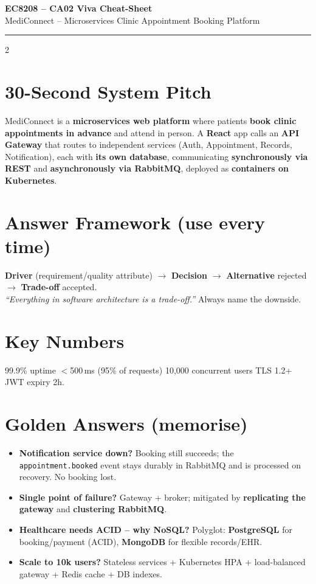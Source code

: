 \documentclass[10pt,a4paper]{article}
\newcommand{\hd}[1]{\textbf{\color{navy}#1}}
\begin{document}
{\centering
{\large\bfseries\color{navy} EC8208 -- CA02 Viva Cheat-Sheet}\\
{\footnotesize\color{grayln} MediConnect -- Microservices Clinic Appointment Booking Platform}\par}
\vspace{2pt}
\hrule
\vspace{3pt}

\begin{multicols}{2}

\section{30-Second System Pitch}
{\footnotesize MediConnect is a \textbf{microservices web platform} where patients \textbf{book
clinic appointments in advance} and attend in person. A \textbf{React} app calls an
\textbf{API Gateway} that routes to independent services (Auth, Appointment, Records,
Notification), each with \textbf{its own database}, communicating \textbf{synchronously via REST}
and \textbf{asynchronously via RabbitMQ}, deployed as \textbf{containers on Kubernetes}.}

\section{Answer Framework (use every time)}
{\footnotesize \hd{Driver} (requirement/quality attribute) $\rightarrow$ \hd{Decision}
$\rightarrow$ \hd{Alternative} rejected $\rightarrow$ \hd{Trade-off} accepted.\\
\textit{``Everything in software architecture is a trade-off.''} Always name the downside.}

\section{Key Numbers}
{\footnotesize 99.9\% uptime \textbullet{} $<$500\,ms (95\% of requests) \textbullet{}
10{,}000 concurrent users \textbullet{} TLS 1.2+ \textbullet{} JWT expiry 2h.}

\section{Golden Answers (memorise)}
{\footnotesize
\begin{itemize}
  \item \hd{Notification service down?} Booking still succeeds; the \texttt{appointment.booked}
        event stays durably in RabbitMQ and is processed on recovery. No booking lost.
  \item \hd{Single point of failure?} Gateway + broker; mitigated by \textbf{replicating the
        gateway} and \textbf{clustering RabbitMQ}.
  \item \hd{Healthcare needs ACID -- why NoSQL?} Polyglot: \textbf{PostgreSQL} for
        booking/payment (ACID), \textbf{MongoDB} for flexible records/EHR.
  \item \hd{Scale to 10k users?} Stateless services + Kubernetes HPA + load-balanced gateway
        + Redis cache + DB indexes.
\end{itemize}}


\end{multicols}
\end{document}
